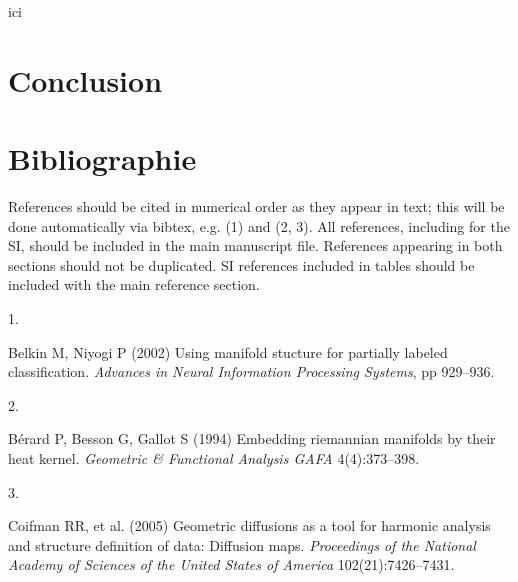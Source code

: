 \documentclass[9pt,twocolumn,twoside,]{pnas-new}
\newlength{\cslhangindent}
\newlength{\csllabelwidth}
\newlength{\cslentryspacingunit} %
\newenvironment{CSLReferences}[2] %
 {%
  \setlength{\parindent}{0pt}
  \ifodd #1
  \let\oldpar\par
  \def\par{\hangindent=\cslhangindent\oldpar}
  \fi
  \setlength{\parskip}{#2\cslentryspacingunit}
 }%
 {}
\newcommand{\CSLLeftMargin}[1]{\parbox[t]{\csllabelwidth}{#1}}
\newcommand{\CSLRightInline}[1]{\parbox[t]{\linewidth - \csllabelwidth}{#1}\break}
\begin{document}
ici

\hypertarget{conclusion}{%
\section*{Conclusion}\label{conclusion}}

\hypertarget{references}{%
\section*{Bibliographie}\label{references}}

References should be cited in numerical order as they appear in text;
this will be done automatically via bibtex, e.g. (1) and (2, 3). All
references, including for the SI, should be included in the main
manuscript file. References appearing in both sections should not be
duplicated. SI references included in tables should be included with the
main reference section.

\showmatmethods
\pnasbreak

\hypertarget{refs}{}
\begin{CSLReferences}{0}{0}
\leavevmode{}%
\CSLLeftMargin{1. }%
\CSLRightInline{Belkin M, Niyogi P (2002) Using manifold stucture for
partially labeled classification. \emph{Advances in Neural Information
Processing Systems}, pp 929--936.}

\leavevmode{}%
\CSLLeftMargin{2. }%
\CSLRightInline{Bérard P, Besson G, Gallot S (1994) Embedding riemannian
manifolds by their heat kernel. \emph{Geometric \& Functional Analysis
GAFA} 4(4):373--398.}

\leavevmode{}%
\CSLLeftMargin{3. }%
\CSLRightInline{Coifman RR, et al. (2005) Geometric diffusions as a tool
for harmonic analysis and structure definition of data: Diffusion maps.
\emph{Proceedings of the National Academy of Sciences of the United
States of America} 102(21):7426--7431.}

\end{CSLReferences}



% 
\end{document}
